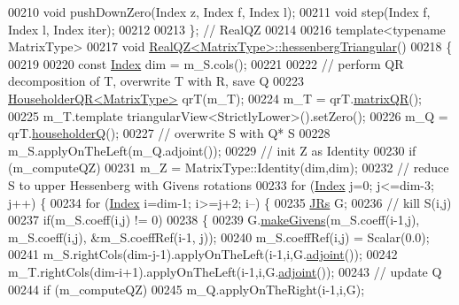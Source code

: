 \begin{DoxyCode}
00210       \textcolor{keywordtype}{void} pushDownZero(Index z, Index f, Index l);
00211       \textcolor{keywordtype}{void} step(Index f, Index l, Index iter);
00212 
00213   \}; \textcolor{comment}{// RealQZ}
00214 
00216   \textcolor{keyword}{template}<\textcolor{keyword}{typename} MatrixType>
00217     \textcolor{keywordtype}{void} \hyperlink{group___eigenvalues___module_class_eigen_1_1_real_q_z}{RealQZ<MatrixType>::hessenbergTriangular}()
00218     \{
00219 
00220       \textcolor{keyword}{const} \hyperlink{group___eigenvalues___module_a6201e534e901b5f4e66f72c176b534a3}{Index} dim = m\_S.cols();
00221 
00222       \textcolor{comment}{// perform QR decomposition of T, overwrite T with R, save Q}
00223       \hyperlink{group___q_r___module}{HouseholderQR<MatrixType>} qrT(m\_T);
00224       m\_T = qrT.\hyperlink{group___q_r___module_ae837f2fb30099212c53b3042c7d699c9}{matrixQR}();
00225       m\_T.template triangularView<StrictlyLower>().setZero();
00226       m\_Q = qrT.\hyperlink{group___q_r___module_affd506c10ef2d25f56e7b1f9f25ff885}{householderQ}();
00227       \textcolor{comment}{// overwrite S with Q* S}
00228       m\_S.applyOnTheLeft(m\_Q.adjoint());
00229       \textcolor{comment}{// init Z as Identity}
00230       \textcolor{keywordflow}{if} (m\_computeQZ)
00231         m\_Z = MatrixType::Identity(dim,dim);
00232       \textcolor{comment}{// reduce S to upper Hessenberg with Givens rotations}
00233       \textcolor{keywordflow}{for} (\hyperlink{group___eigenvalues___module_a6201e534e901b5f4e66f72c176b534a3}{Index} j=0; j<=dim-3; j++) \{
00234         \textcolor{keywordflow}{for} (\hyperlink{group___eigenvalues___module_a6201e534e901b5f4e66f72c176b534a3}{Index} i=dim-1; i>=j+2; i--) \{
00235           \hyperlink{group___jacobi___module_class_eigen_1_1_jacobi_rotation}{JRs} G;
00236           \textcolor{comment}{// kill S(i,j)}
00237           \textcolor{keywordflow}{if}(m\_S.coeff(i,j) != 0)
00238           \{
00239             G.\hyperlink{group___jacobi___module_af73c81e9cc139b7e0d877ce553b02ec0}{makeGivens}(m\_S.coeff(i-1,j), m\_S.coeff(i,j), &m\_S.coeffRef(i-1, j));
00240             m\_S.coeffRef(i,j) = Scalar(0.0);
00241             m\_S.rightCols(dim-j-1).applyOnTheLeft(i-1,i,G.\hyperlink{group___jacobi___module_a89c8ea615f8fa77ddd5810a1e5fde4da}{adjoint}());
00242             m\_T.rightCols(dim-i+1).applyOnTheLeft(i-1,i,G.\hyperlink{group___jacobi___module_a89c8ea615f8fa77ddd5810a1e5fde4da}{adjoint}());
00243             \textcolor{comment}{// update Q}
00244             \textcolor{keywordflow}{if} (m\_computeQZ)
00245               m\_Q.applyOnTheRight(i-1,i,G);

\end{DoxyCode}
